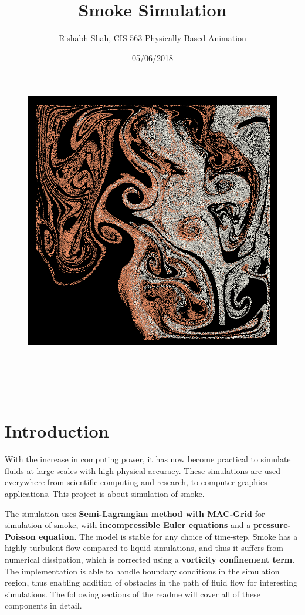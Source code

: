 \documentclass[a4paper,11pt]{article}
\makeatletter
\newcommand{\linia}{\rule{\linewidth}{0.5pt}}
\theoremstyle{mytheor}
\renewcommand{\maketitle}{
\begin{center}
\vspace{2ex}
{\huge \textsc{\@title}}
\vspace{1ex}
\\
\linia\\
\@author \hfill \@date
\vspace{4ex}
\end{center}
}
\makeatother
\begin{document}
\title{Smoke Simulation}

\author{Rishabh Shah, CIS 563 Physically Based Animation}

\date{05/06/2018}

\begin{figure}[H]
\includegraphics[width=150mm]{interacting2_5.png}
\centering
\end{figure}


\maketitle

\section*{Introduction}

With the increase in computing power, it has now become practical to simulate fluids at large scales with high physical accuracy. These simulations are used everywhere from scientific computing and research, to computer graphics applications. This project is about simulation of smoke.

\par
\noindent
The simulation uses \textbf{Semi-Lagrangian method with MAC-Grid} for simulation of smoke, with \textbf{incompressible Euler equations} and a \textbf{pressure-Poisson equation}. The model is stable for any choice of time-step. Smoke has a highly turbulent flow compared to liquid simulations, and thus it suffers from numerical dissipation, which is corrected using a \textbf{vorticity confinement term}. The implementation is able to handle boundary conditions in the simulation region, thus enabling addition of obstacles in the path of fluid flow for interesting simulations. The following sections of the readme will cover all of these components in detail.
\end{document}
